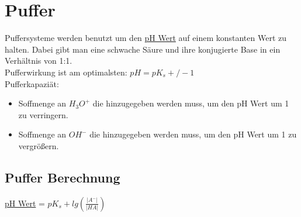 \section{Puffer} \label{sec:puffer}
Puffersysteme werden benutzt um den \hyperref[sec:ph_wert]{pH Wert} auf einem konstanten Wert zu halten.
Dabei gibt man eine schwache Säure und ihre konjugierte Base in ein Verhältnis von 1:1. \\
Pufferwirkung ist am optimalsten: $pH = pK_s +/- 1$ \\
Pufferkapaziät:
\begin{itemize}
    \item Soffmenge an $H_3O^+$ die hinzugegeben werden muss, um den pH Wert um 1 zu verringern.
    \item Soffmenge an $OH^-$ die hinzugegeben werden muss, um den pH Wert um 1 zu vergrößern.
\end{itemize}

\subsection{Puffer Berechnung}
\hyperref[sec:ph_wert]{pH Wert} = $pK_s + lg(\frac{|A^-|}{|HA|})$

